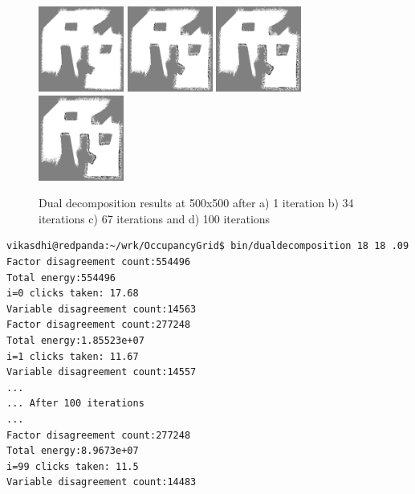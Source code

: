 \documentclass[10pt,oneside,letterpaper]{article}
\begin{document}
\begin{figure}
  \includegraphics[width=0.25\textwidth]{dualdecomposition0_500x500.png}%
  \includegraphics[width=0.25\textwidth]{dualdecomposition33_500x500.png}%
  \includegraphics[width=0.25\textwidth]{dualdecomposition66_500x500.png}%
  \includegraphics[width=0.25\textwidth]{dualdecomposition99_500x500.png}
  \caption{Dual decomposition results at 500x500 after a) 1 iteration b) 34 iterations c) 67 iterations and d) 100 iterations}
  \label{fig:dualdecomposition500x500}
\end{figure}

\lstset{language=bash}
\begin{lstlisting}
vikasdhi@redpanda:~/wrk/OccupancyGrid$ bin/dualdecomposition 18 18 .09
Factor disagreement count:554496
Total energy:554496
i=0 clicks taken: 17.68
Variable disagreement count:14563
Factor disagreement count:277248
Total energy:1.85523e+07
i=1 clicks taken: 11.67
Variable disagreement count:14557
...
... After 100 iterations
...
Factor disagreement count:277248
Total energy:8.9673e+07
i=99 clicks taken: 11.5
Variable disagreement count:14483
\end{lstlisting}
\end{document}
